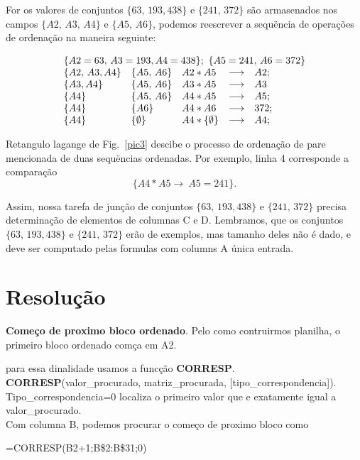 \documentclass[12pt]{article}
\begin{document}
For os valores de conjuntos $\{63,\, 193, 438\}$ e $\{241,\,
372\}$ s\~ao armasenados nos campos $\{ A2,\, A3,\, A4\}$ e $\{
A5,\, A6\}$, podemos reescrever a sequ\"encia de opera\c{c}\~oes
de ordena\c{c}\~ao na maneira seguinte:

$$
\begin{array}{lllll}
\multicolumn{5}{c}{\{A2=63,\, A3=193, A4=438\};\ \{A5=241,\,
A6=372\}}\\
\{A2,\, A3, A4\}& \{A5,\, A6\}& A2 * A5 &\longrightarrow &
A2;\\
\{ A3, A4\}& \{A5,\, A6\}& A3 * A5 &\longrightarrow& A3
\\
\{ A4\}& \{A5,\, A6\}& A4 * A5 &\longrightarrow & A5;
\\
\{ A4\}& \{A6\}& A4 * A6& \longrightarrow& 372;
\\
\{  A4\}& \{\emptyset \}& A4 * \{\emptyset\}& \longrightarrow& A4;
\end{array}$$

Retangulo lagange de Fig.~\ref{pic3} descibe o processo de
ordena\c{c}\~ao de pare mencionada de duas sequ\"encias ordenadas.
Por exemplo, linha 4 corresponde a compara\c{c}\~ao $$ \{A4 * A5
\longrightarrow \  A5 =241\}.
$$

Assim, nossa tarefa de jun\c{c}\~ao de conjuntos $\{63,\, 193,
438\}$ e $\{241,\, 372\}$ precisa determina\c{c}\~ao de elementos
de columnas C e D. Lembramos, que os conjuntos $\{63,\, 193,
438\}$ e $\{241,\, 372\}$ er\~ao de exemplos, mas tamanho deles
n\~ao \'e dado, e deve ser computado pelas formulas com columns A
\'unica entrada.

\section{Resolu\c{c}\~ao}

\textbf{Come\c{c}o de proximo bloco ordenado}. Pelo como
contruirmos planilha, o primeiro bloco ordenado com\c{c}a em A2.

para essa dinalidade usamos a func\c{c}\~ao \textbf{CORRESP}.\\

\noindent\textbf{CORRESP}(valor\_procurado, matriz\_procurada,
[tipo\_correspondencia]).\\
Tipo\_correspondencia=0 localiza o
primeiro valor que e exatamente igual a valor\_procurado.\\

Com columna B, podemos procurar o come\c{c}o de proximo bloco como

\centerline{=CORRESP(B2+1;B\$2:B\$31;0)}
\end{document}
